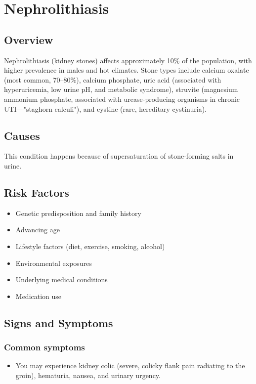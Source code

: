 \chapter{Nephrolithiasis}
\label{sec:Nephrolithiasis}

\section{Overview}
Nephrolithiasis (kidney stones) affects approximately 10\% of the population, with higher prevalence in males and hot climates. Stone types include calcium oxalate (most common, 70--80\%), calcium phosphate, uric acid (associated with hyperuricemia, low urine pH, and metabolic syndrome), struvite (magnesium ammonium phosphate, associated with urease-producing organisms in chronic UTI---"staghorn calculi"), and cystine (rare, hereditary cystinuria).
\section{Causes}
This condition happens because of supersaturation of stone-forming salts in urine.     
\section{Risk Factors}

\begin{itemize}[noitemsep]
  \item Genetic predisposition and family history
  \item Advancing age
  \item Lifestyle factors (diet, exercise, smoking, alcohol)
  \item Environmental exposures
  \item Underlying medical conditions
  \item Medication use
\end{itemize}
\section{Signs and Symptoms}

\subsection{Common symptoms}
\begin{itemize}[noitemsep]
  \item You may experience kidney colic (severe, colicky flank pain radiating to the groin), hematuria, nausea, and urinary urgency. 
  \end{itemize}

